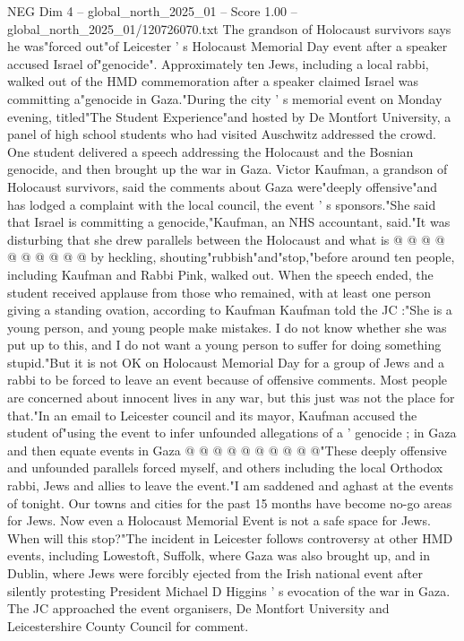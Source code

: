 \begin{textsample}{NEG Dim 4 – global\_north\_2025\_01 – Score 1.00 – global\_north\_2025\_01/120726070.txt}  \label{ex:f4_neg_411}
The grandson of Holocaust survivors says he was"forced out"of Leicester ' s Holocaust Memorial Day event after a speaker accused Israel of"genocide".
Approximately ten Jews, including a local rabbi, walked out of the HMD commemoration after a speaker claimed Israel was committing a"genocide in Gaza."During the city ' s memorial event on Monday evening, titled"The Student Experience"and hosted by De Montfort University, a panel of high school students who had visited Auschwitz addressed the crowd.
One student delivered a speech addressing the Holocaust and the Bosnian genocide, and then brought up the war in Gaza.
Victor Kaufman, a grandson of Holocaust survivors, said the comments about Gaza were"deeply offensive"and has lodged a complaint with the local council, the event ' s sponsors."She said that Israel is committing a genocide,"Kaufman, an NHS accountant, said."It was disturbing that she drew parallels between the Holocaust and what is @ @ @ @ @ @ @ @ @ @ by heckling, shouting"rubbish"and"stop,"before around ten people, including Kaufman and Rabbi Pink, walked out.
When the speech ended, the student received applause from those who remained, with at least one person giving a standing ovation, according to Kaufman Kaufman told the JC :"She is a young person, and young people make mistakes.
I do not know whether she was put up to this, and I do not want a young person to suffer for doing something stupid."But it is not OK on Holocaust Memorial Day for a group of Jews and a rabbi to be forced to leave an event because of offensive comments.
Most people are concerned about innocent lives in any war, but this just was not the place for that."In an email to Leicester council and its mayor, Kaufman accused the student of"using the event to infer unfounded allegations of a ' genocide ; in Gaza and then equate events in Gaza @ @ @ @ @ @ @ @ @ @"These deeply offensive and unfounded parallels forced myself, and others including the local Orthodox rabbi, Jews and allies to leave the event."I am saddened and aghast at the events of tonight.
Our towns and cities for the past 15 months have become no-go areas for Jews.
Now even a Holocaust Memorial Event is not a safe space for Jews.
When will this stop?"The incident in Leicester follows controversy at other HMD events, including Lowestoft, Suffolk, where Gaza was also brought up, and in Dublin, where Jews were forcibly ejected from the Irish national event after silently protesting President Michael D Higgins ' s evocation of the war in Gaza.
The JC approached the event organisers, De Montfort University and Leicestershire County Council for comment.

\end{textsample}
